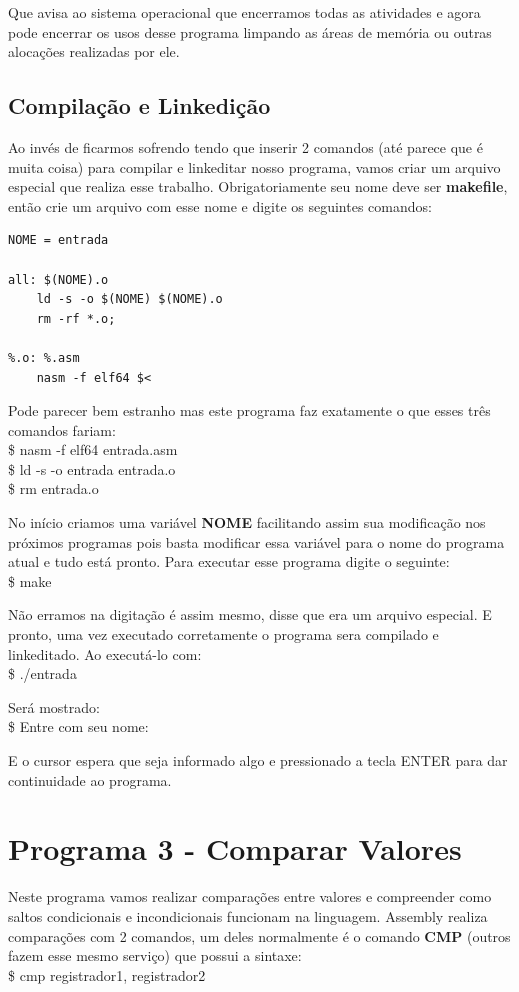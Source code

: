 Que avisa ao sistema operacional que encerramos todas as atividades e agora pode encerrar os usos desse programa limpando as áreas de memória ou outras alocações realizadas por ele.

\subsection{Compilação e Linkedição}

Ao invés de ficarmos sofrendo tendo que inserir 2 comandos (até parece que é muita coisa) para compilar e linkeditar nosso programa, vamos criar um arquivo especial que realiza esse trabalho. Obrigatoriamente seu nome deve ser \textbf{makefile}, então crie um arquivo com esse nome e digite os seguintes comandos:
\begin{lstlisting}[]
NOME = entrada

all: $(NOME).o
	ld -s -o $(NOME) $(NOME).o
	rm -rf *.o;

%.o: %.asm
	nasm -f elf64 $<
\end{lstlisting}

Pode parecer bem estranho mas este programa faz exatamente o que esses três comandos fariam: \\
{\ttfamily\$ nasm -f elf64 entrada.asm} \\
{\ttfamily\$ ld -s -o entrada entrada.o} \\
{\ttfamily\$ rm entrada.o}

No início criamos uma variável \textbf{NOME} facilitando assim sua modificação nos próximos programas pois basta modificar essa variável para o nome do programa atual e tudo está pronto. Para executar esse programa digite o seguinte: \\
{\ttfamily\$ make}

Não erramos na digitação é assim mesmo, disse que era um arquivo especial. E pronto, uma vez executado corretamente o programa sera compilado e linkeditado. Ao executá-lo com: \\
{\ttfamily\$ ./entrada}

Será mostrado: \\
{\ttfamily\$ Entre com seu nome:}

E o cursor espera que seja informado algo e pressionado a tecla ENTER para dar continuidade ao programa.

\section{Programa 3 - Comparar Valores}
Neste programa vamos realizar comparações entre valores e compreender como saltos condicionais e incondicionais funcionam na linguagem. Assembly realiza comparações com 2 comandos, um deles normalmente é o comando \textbf{CMP} (outros fazem esse mesmo serviço) que possui a sintaxe: \\
{\ttfamily\$ cmp registrador1, registrador2}


